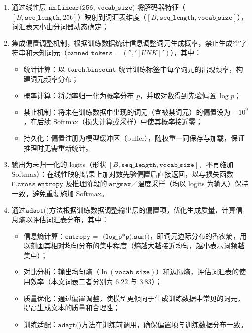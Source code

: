 \begin{enumerate}[label={（\arabic*）}, leftmargin=2em, labelsep=0.5em, itemsep=0pt]
        \begin{enumerate}[label={（\alph*）}, leftmargin=2em, labelsep=0.5em, itemsep=0pt]
            \item 通过线性层 $\texttt{nn.Linear(256, vocab\_size)}$ 将解码器特征（$[B, \texttt{seq\_length}, 256]$）映射到词汇表维度（$[B, \texttt{seq\_length}, \texttt{vocab\_size}]$），词汇表大小由分词器动态确定；
            \item 集成偏置调整机制，根据训练数据统计信息调整词元生成概率，禁止生成空字符串和未知词元（$\texttt{banned\_tokens}=('', '[UNK]')$），其中：
            \begin{itemize}
                \item 统计计算：以 $\texttt{torch.bincount}$ 统计训练标签中每个词元的出现频率，构建词元频率分布；
                \item 概率计算：将频率归一化为概率分布 $p$，并取对数得到先验偏置 $\log p$；
                \item 禁止机制：将未在训练数据中出现的词元（含被禁词元）的偏置设为 $-10^9$，在后续 Softmax（损失计算或采样）中使其概率接近零；
                \item 持久化：偏置注册为模型缓冲区（buffer），随权重一同保存与加载，保证推理时无需重新统计。
            \end{itemize}
            \item 输出为未归一化的 logits（形状 $[B, \texttt{seq\_length}, \texttt{vocab\_size}]$，不再施加 Softmax）：在线性映射结果上加对数先验偏置后直接返回，以与损失函数 $\texttt{F.cross\_entropy}$ 及推理阶段的 $\texttt{argmax}$／温度采样（均以 logits 为输入）保持一致，避免重复施加 Softmax。
            \item 通过$\texttt{adapt()}$方法根据训练数据调整输出层的偏置项，优化生成质量，计算信息熵以评估词汇表分布，其中：
            \begin{itemize}
                \item 信息熵计算：$\texttt{entropy = -(log\_p*p).sum()}$，即词元边际分布的香农熵，用以刻画其相对均匀分布的集中程度（熵越大越接近均匀，越小表示词频越集中）；
                \item 对比分析：输出均匀熵（$\ln(\texttt{vocab\_size})$）和边际熵，评估词汇表的使用效率（本文词表二者分别为 $6.22$ 与 $3.83$）；
                \item 质量优化：通过偏置调整，使模型更倾向于生成训练数据中常见的词元，提高生成文本的质量和合理性；
                \item 训练适配：$\texttt{adapt()}$方法在训练前调用，确保偏置项与训练数据分布一致。
            \end{itemize}

\end{enumerate}
\end{enumerate}
